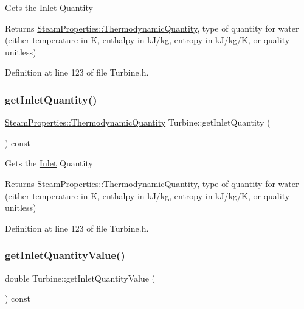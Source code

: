 Gets the \hyperlink{class_inlet}{Inlet} Quantity

\begin{DoxyReturn}{Returns}
\hyperlink{class_steam_properties_ae0294bedf7d178c2d8fb6aed0f62fbff}{Steam\+Properties\+::\+Thermodynamic\+Quantity}, type of quantity for water (either temperature in K, enthalpy in k\+J/kg, entropy in k\+J/kg/K, or quality -\/ unitless) 
\end{DoxyReturn}


Definition at line 123 of file Turbine.\+h.

\mbox{\label{class_turbine_ac9e91d9539cea5cd1e0037c397c28c78}} 
\subsubsection{\texorpdfstring{get\+Inlet\+Quantity()}{getInletQuantity()}\hspace{0.1cm}{\footnotesize\ttfamily [3/3]}}
{\footnotesize\ttfamily \hyperlink{class_steam_properties_ae0294bedf7d178c2d8fb6aed0f62fbff}{Steam\+Properties\+::\+Thermodynamic\+Quantity} Turbine\+::get\+Inlet\+Quantity (\begin{DoxyParamCaption}{ }\end{DoxyParamCaption}) const\hspace{0.3cm}{\ttfamily [inline]}}

Gets the \hyperlink{class_inlet}{Inlet} Quantity

\begin{DoxyReturn}{Returns}
\hyperlink{class_steam_properties_ae0294bedf7d178c2d8fb6aed0f62fbff}{Steam\+Properties\+::\+Thermodynamic\+Quantity}, type of quantity for water (either temperature in K, enthalpy in k\+J/kg, entropy in k\+J/kg/K, or quality -\/ unitless) 
\end{DoxyReturn}


Definition at line 123 of file Turbine.\+h.

\mbox{\label{class_turbine_a3d8a3f317fa71abb3404144371615725}} 
\subsubsection{\texorpdfstring{get\+Inlet\+Quantity\+Value()}{getInletQuantityValue()}\hspace{0.1cm}{\footnotesize\ttfamily [1/3]}}
{\footnotesize\ttfamily double Turbine\+::get\+Inlet\+Quantity\+Value (\begin{DoxyParamCaption}{ }\end{DoxyParamCaption}) const\hspace{0.3cm}{\ttfamily [inline]}}

